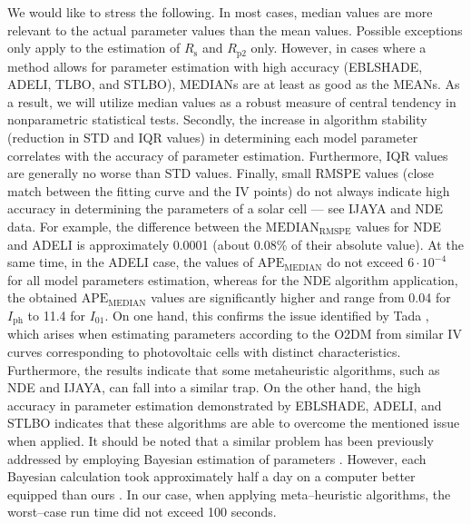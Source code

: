 \documentclass[a4paper,fleqn]{cas-dc}
\begin{document}
We would like to stress the following.
In most cases, median values are more relevant to the actual parameter values than the mean values.
Possible exceptions only apply to the estimation of $R_\mathrm{s}$ and $R_\mathrm{p2}$ only.
However, in cases where a method allows for parameter estimation with high accuracy (EBLSHADE, ADELI, TLBO, and STLBO),
MEDIANs are at least as good as the MEANs.
As a result, we will utilize median values as a robust measure of central tendency in nonparametric statistical tests.
Secondly, the increase in algorithm stability (reduction in STD and IQR values) in determining each model parameter correlates with the accuracy of parameter estimation.
Furthermore, IQR values are generally no worse than STD values.
Finally, small RMSPE values (close match between the fitting curve and the IV points)
do not always indicate high accuracy in determining the parameters of a solar cell --- see IJAYA and NDE data.
For example, the difference between the $\mathrm{MEDIAN}_\mathrm{RMSPE}$ values for NDE and ADELI is approximately 0.0001
(about 0.08\% of their absolute value).
At the same time, in the ADELI case, the values of $\mathrm{APE}_\mathrm{MEDIAN}$ do not exceed $6\cdot 10^{-4}$
for all model parameters estimation,
whereas for the NDE algorithm application, the obtained $\mathrm{APE}_\mathrm{MEDIAN}$ values are significantly higher
and range from 0.04 for $I_\mathrm{ph}$ to 11.4 for $I_{01}$.
On one hand, this confirms the issue identified by Tada \cite{Tada2015Organic,Tada2021}, which arises when estimating
parameters according to the O2DM from similar IV curves corresponding to photovoltaic cells with distinct characteristics.
Furthermore, the results indicate that some metaheuristic algorithms, such as NDE and IJAYA, can fall into a similar trap.
On the other hand, the high accuracy in parameter estimation demonstrated by EBLSHADE, ADELI, and STLBO indicates
that these algorithms are able to overcome the mentioned issue when applied.
It should be noted that a similar problem has been previously addressed by employing Bayesian estimation of parameters \cite{Tada2021}.
However, each Bayesian calculation took approximately half a day on a computer better equipped than ours \cite{Tada2021}.
In our case, when applying meta--heuristic algorithms, the worst--case run time did not exceed 100 seconds.
\end{document}
